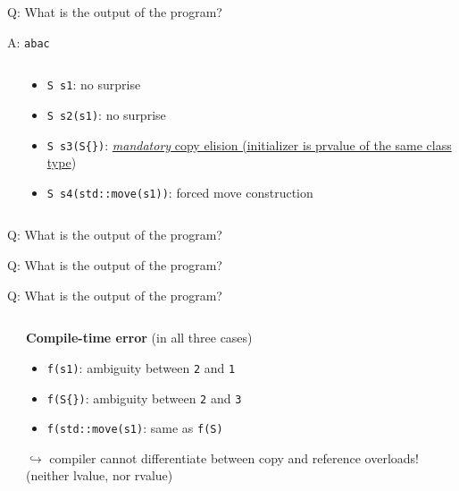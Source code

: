 \begin{frame}[fragile]{Q: What is the output of the program?}
\end{frame}

\begin{frame}[fragile]{A: \texttt{abac}}
    \begin{columns}
        \begin{column}{.5\textwidth}
        \end{column}
        \begin{column}{.45\textwidth}
            \begin{itemize}
                \item \texttt{S s1}: no surprise
                \item \texttt{S s2(s1)}: no surprise
                \item \texttt{S s3(S\{\})}: \href{https://en.cppreference.com/w/cpp/language/copy_elision}{\textit{mandatory} copy elision (initializer is prvalue of the same class type})
                \item \texttt{S s4(std::move(s1))}: forced move construction
            \end{itemize}
        \end{column}
    \end{columns}
\end{frame}

\begin{frame}[fragile]{Q: What is the output of the program?}
\end{frame}


\begin{frame}[fragile]{Q: What is the output of the program?}
\end{frame}

\begin{frame}[fragile]{Q: What is the output of the program?}
    \begin{columns}
        \begin{column}{.46\textwidth}
        \end{column}
        \begin{column}{.49\textwidth}
            \textbf{Compile-time error} (in all three cases)
            \begin{itemize}
                \item \texttt{f(s1)}: ambiguity between \texttt{2} and \texttt{1}
                \item \texttt{f(S\{\})}: ambiguity between \texttt{2} and \texttt{3}
                \item \texttt{f(std::move(s1)}: same as \texttt{f(S{})}
            \end{itemize}

            $\hookrightarrow$ compiler cannot differentiate between copy and reference overloads! (neither lvalue, nor rvalue)
        \end{column}
    \end{columns}
\end{frame}

